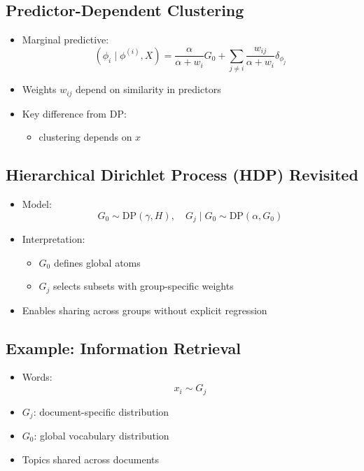 \documentclass[12pt,oneside]{book}
\numberwithin{equation}{section}
\theoremstyle{definition}
\theoremstyle{plain}
\theoremstyle{remark}
\begin{document}
\subsection{Predictor-Dependent Clustering}

\begin{itemize}
\item Marginal predictive:
\[
(\phi_i \mid \phi^{(i)}, X)
=
\frac{\alpha}{\alpha + w_i} G_0
+
\sum_{j \neq i} \frac{w_{ij}}{\alpha + w_i} \delta_{\phi_j}
\]
\item Weights $w_{ij}$ depend on similarity in predictors
\item Key difference from DP:
\begin{itemize}
\item clustering depends on $x$
\end{itemize}
\end{itemize}

\subsection*{Hierarchical Dirichlet Process (HDP) Revisited}

\begin{itemize}
\item Model:
\[
G_0 \sim \mathrm{DP}(\gamma, H), \quad G_j \mid G_0 \sim \mathrm{DP}(\alpha, G_0)
\]
\item Interpretation:
\begin{itemize}
\item $G_0$ defines global atoms
\item $G_j$ selects subsets with group-specific weights
\end{itemize}
\item Enables sharing across groups without explicit regression
\end{itemize}

\subsection{Example: Information Retrieval}

\begin{itemize}
\item Words:
\[
x_i \sim G_j
\]
\item $G_j$: document-specific distribution
\item $G_0$: global vocabulary distribution
\item Topics shared across documents
\end{itemize}
\end{document}
